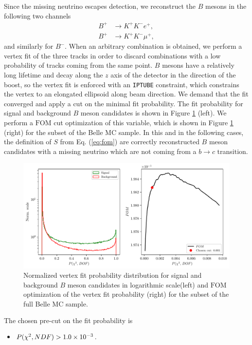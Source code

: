 Since the missing neutrino escapes detection, we reconstruct the $B$ mesons in the following two channels
\begin{align*}
B^+ &\to K^+ K^- e^+, \\
B^+ &\to K^+ K^- \mu^+,
\end{align*}
and similarly for $B^-$. When an arbitrary combination is obtained, we perform a vertex fit of the three tracks in order to discard combinations with a low probability of tracks coming from the same point. $B$ mesons have a relatively long lifetime and decay along the $z$ axis of the detector in the direction of the boost, so the vertex fit is enforced with an \texttt{IPTUBE} constraint, which constrains the vertex to an elongated ellipsoid along beam direction. We demand that the fit converged and apply a cut on the minimal fit probability. The fit probability for signal and background $B$ meson candidates is shown in Figure \ref{fig:vtx} (left). We perform a $\mathrm{FOM}$ cut optimization of this variable, which is shown in Figure \ref{fig:vtx} (right) for the subset of the Belle MC sample. In this and in the following cases, the definition of $S$ from Eq. (\ref{eq:fom}) are correctly reconstructed $B$ meson candidates with a missing neutrino which are not coming from a $b \to c$ transition.

\begin{figure}[H]
	\centering
	\captionsetup{width=0.8\linewidth}
	\includegraphics[width=\linewidth]{fig/VTX}
	\caption{Normalized vertex fit probability distribution for signal and background $B$ meson candidates in logarithmic scale(left) and $\mathrm{FOM}$ optimization of the vertex fit probability (right) for the subset of the full Belle MC sample.}
	\label{fig:vtx}
\end{figure}

The chosen pre-cut on the fit probability is
\begin{itemize}
	\item $P(\chi^2,NDF) > 1.0\times 10^{-3}$.
\end{itemize}

